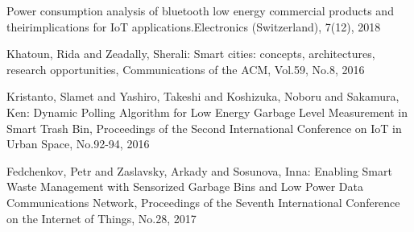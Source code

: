 \documentclass[Japanese]{dicomopapers}
\begin{document}
\begin{thebibliography}{4}
     Power consumption analysis of bluetooth low energy commercial products and theirimplications for IoT applications.Electronics (Switzerland), 7(12), 2018

     Khatoun, Rida and Zeadally, Sherali: Smart cities: concepts, architectures, research opportunities, Communications of the ACM, Vol.59, No.8, 2016

     Kristanto, Slamet and Yashiro, Takeshi and Koshizuka, Noboru and Sakamura, Ken: Dynamic Polling Algorithm for Low Energy Garbage Level Measurement in Smart Trash Bin, Proceedings of the Second International Conference on IoT in Urban Space, No.92-94, 2016

     Fedchenkov, Petr and Zaslavsky, Arkady and Sosunova, Inna: Enabling Smart Waste Management with Sensorized Garbage Bins and Low Power Data Communications Network, Proceedings of the Seventh International Conference on the Internet of Things, No.28, 2017

\end{thebibliography}
\end{document}
